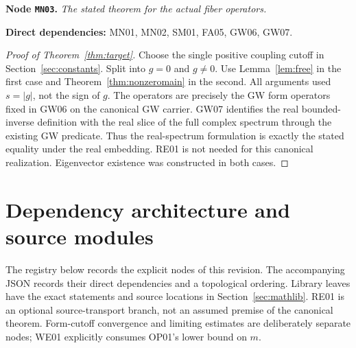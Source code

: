 \documentclass[11pt,a4paper]{article}
\theoremstyle{remark}\newtheorem{remark}[theorem]{Remark}
\newcommand{\abs}[1]{\lvert #1\rvert}\newcommand{\rankone}[2]{\lvert #1\rangle\langle #2\rvert}
\newcommand{\node}[3]{\par\Needspace{6\baselineskip}\smallskip\hypertarget{node:#1}{}\label{nodepage:#1}\noindent\textbf{Node \texttt{#1}.} \textit{#2.}\par\noindent\textbf{Direct dependencies:} #3.\par}
\begin{document}
\node{MN03}{The stated theorem for the actual fiber operators}{MN01, MN02, SM01, FA05, GW06, GW07}
\begin{proof}[Proof of Theorem~\ref{thm:target}]
Choose the single positive coupling cutoff in Section~\ref{sec:constants}. Split into $g=0$ and $g\ne0$. Use Lemma~\ref{lem:free} in the first case and Theorem~\ref{thm:nonzeromain} in the second. All arguments used $s=\abs g$, not the sign of $g$. The operators are precisely the GW form operators fixed in GW06 on the canonical GW carrier. GW07 identifies the real bounded-inverse definition with the real slice of the full complex spectrum through the existing GW predicate. Thus the real-spectrum formulation is exactly the stated equality under the real embedding. RE01 is not needed for this canonical realization. Eigenvector existence was constructed in both cases.
\end{proof}

\clearpage
\section{Dependency architecture and source modules}\label{sec:registry}
The registry below records the explicit nodes of this revision. The accompanying JSON records their direct dependencies and a topological ordering. Library leaves have the exact statements and source locations in Section~\ref{sec:mathlib}. RE01 is an optional source-transport branch, not an assumed premise of the canonical theorem. Form-cutoff convergence and limiting estimates are deliberately separate nodes; WE01 explicitly consumes OP01's lower bound on $m$.
\end{document}

